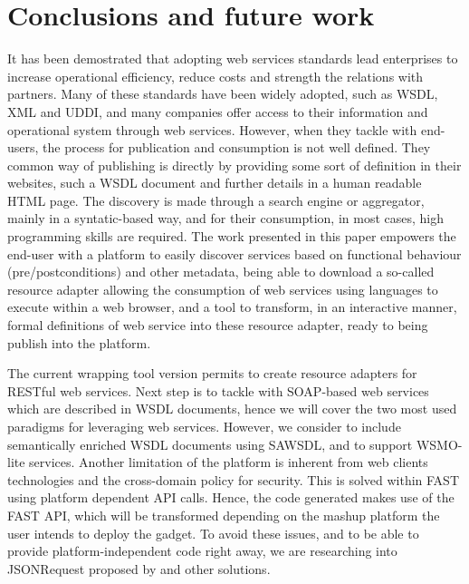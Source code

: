 
\section{Conclusions and future work}

It has been demostrated that adopting web services standards lead enterprises to increase operational efficiency, reduce costs and strength the relations with partners. Many of these standards have been widely adopted, such as WSDL, XML and UDDI, and many companies offer access to their information and operational system through web services. However, when they tackle with end-users, the process for publication and consumption is not well defined. They common way of publishing is directly by providing some sort of definition in their websites, such a WSDL document and further details in a human readable HTML page. The discovery is made through a search engine or aggregator, mainly in a syntatic-based way, and for their consumption, in most cases, high programming skills are required. The work presented in this paper empowers the end-user with a platform to easily discover services based on functional behaviour (pre/postconditions) and other metadata, being able to download a so-called resource adapter allowing the consumption of web services using languages to execute within a web browser, and a tool to transform, in an interactive manner, formal definitions of web service into these resource adapter, ready to being publish into the platform.

The current wrapping tool version permits to create resource adapters for RESTful web services. Next step is to tackle with SOAP-based web services which are described in WSDL documents, hence we will cover the two most used paradigms for leveraging web services. However, we consider to include semantically enriched WSDL documents using SAWSDL, and to support WSMO-lite services. Another limitation of the platform is inherent from web clients technologies and the cross-domain policy for security. This is solved within FAST using platform dependent API calls. Hence, the code generated makes use of the FAST API, which will be transformed depending on the mashup platform the user intends to deploy the gadget. To avoid these issues, and to be able to provide platform-independent code right away, we are researching into JSONRequest proposed by \cite{crockford2006} and other solutions.
